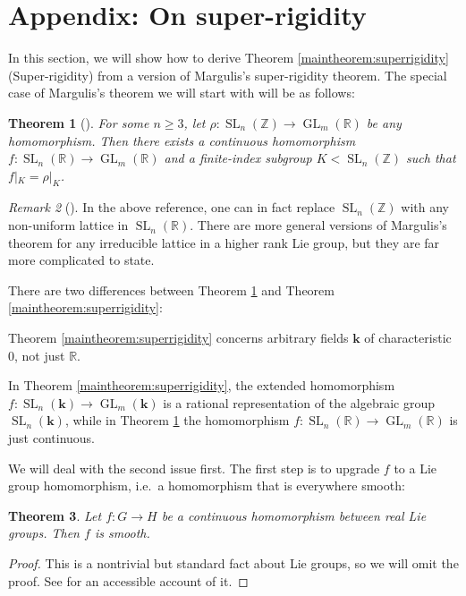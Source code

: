 \documentclass[11pt]{article}
\numberwithin{equation}{section}
\theoremstyle{plain}
\newtheorem{theorem}{Theorem}[section]
\theoremstyle{definition}
\theoremstyle{remark}
\newtheorem{rmk}[theorem]{Remark}
\newenvironment{remark}[1][]{\begin{rmk}[#1] \pushQED{\qed}}{\popQED \end{rmk}}
\DeclareMathOperator{\GL}{GL}
\DeclareMathOperator{\SL}{SL}
\newcommand\R{\ensuremath{\mathbb{R}}}
\newcommand\Z{\ensuremath{\mathbb{Z}}}
\newcommand\bk{\ensuremath{\mathbf{k}}}
\begin{document}
\section{Appendix: On super-rigidity}
\label{appendix:rigidity}

In this section, we will show how to derive Theorem \ref{maintheorem:superrigidity} (Super-rigidity) from
a version of Margulis's super-rigidity theorem.  The special case of Margulis's theorem we will start with
will be as follows:

\begin{theorem}[{\cite[Theorem 16.1.1]{WitteBook}}]
\label{theorem:margulis1}
For some $n \geq 3$, let $\rho\colon \SL_n(\Z) \rightarrow \GL_m(\R)$ be any homomorphism.  Then there exists a continuous
homomorphism $f\colon \SL_n(\R) \rightarrow \GL_m(\R)$ and a finite-index subgroup $K<\SL_n(\Z)$
such that $f|_K = \rho|_K$.
\end{theorem}

\begin{remark}
In the above reference, one can in fact replace $\SL_n(\Z)$ with any non-uniform lattice in $\SL_n(\R)$.
There are more general versions of Margulis's theorem for any irreducible lattice in a higher rank Lie group,
but they are far more complicated to state.
\end{remark}

There are two differences between Theorem \ref{theorem:margulis1} and Theorem \ref{maintheorem:superrigidity}:
\begin{compactitem}
\item Theorem \ref{maintheorem:superrigidity} concerns arbitrary fields $\bk$ of characteristic $0$, not just $\R$.
\item In Theorem \ref{maintheorem:superrigidity}, the extended homomorphism 
$f\colon \SL_n(\bk) \rightarrow \GL_m(\bk)$ is a rational representation of the
algebraic group $\SL_n(\bk)$, while in Theorem \ref{theorem:margulis1} the homomorphism
$f\colon \SL_n(\R) \rightarrow \GL_m(\R)$ is just continuous.
\end{compactitem}
We will deal with the second issue first.  The first step is to upgrade $f$ to a
Lie group homomorphism, i.e.\ a homomorphism that is everywhere smooth:

\begin{theorem}
\label{theorem:autosmooth}
Let $f\colon G \rightarrow H$ be a continuous homomorphism between real Lie groups.  Then
$f$ is smooth.
\end{theorem}
\begin{proof}
This is a nontrivial but standard fact about Lie groups, so we will omit the proof.
See \cite[Proposition 2.4.6]{TaoBook} for an accessible account of it.
\end{proof}
\end{document}
